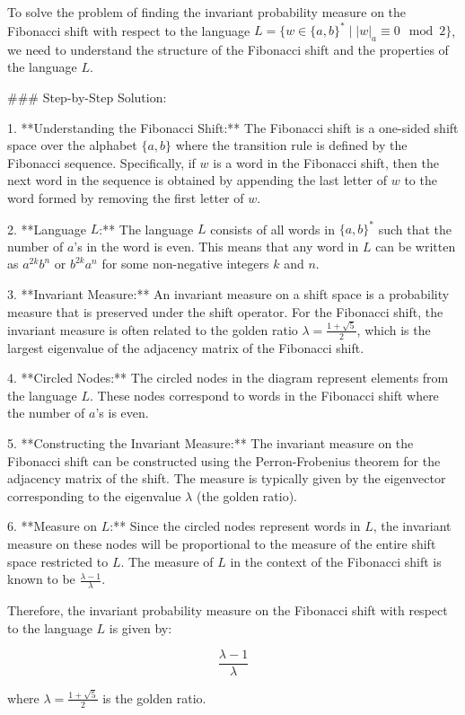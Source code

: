 To solve the problem of finding the invariant probability measure on the Fibonacci shift with respect to the language \( L = \{w \in \{a, b\}^* \mid |w|_a \equiv 0 \mod 2\} \), we need to understand the structure of the Fibonacci shift and the properties of the language \( L \).

### Step-by-Step Solution:

1. **Understanding the Fibonacci Shift:**
   The Fibonacci shift is a one-sided shift space over the alphabet \(\{a, b\}\) where the transition rule is defined by the Fibonacci sequence. Specifically, if \( w \) is a word in the Fibonacci shift, then the next word in the sequence is obtained by appending the last letter of \( w \) to the word formed by removing the first letter of \( w \).

2. **Language \( L \):**
   The language \( L \) consists of all words in \(\{a, b\}^*\) such that the number of \( a \)'s in the word is even. This means that any word in \( L \) can be written as \( a^{2k}b^n \) or \( b^{2k}a^n \) for some non-negative integers \( k \) and \( n \).

3. **Invariant Measure:**
   An invariant measure on a shift space is a probability measure that is preserved under the shift operator. For the Fibonacci shift, the invariant measure is often related to the golden ratio \(\lambda = \frac{1 + \sqrt{5}}{2}\), which is the largest eigenvalue of the adjacency matrix of the Fibonacci shift.

4. **Circled Nodes:**
   The circled nodes in the diagram represent elements from the language \( L \). These nodes correspond to words in the Fibonacci shift where the number of \( a \)'s is even.

5. **Constructing the Invariant Measure:**
   The invariant measure on the Fibonacci shift can be constructed using the Perron-Frobenius theorem for the adjacency matrix of the shift. The measure is typically given by the eigenvector corresponding to the eigenvalue \(\lambda\) (the golden ratio).

6. **Measure on \( L \):**
   Since the circled nodes represent words in \( L \), the invariant measure on these nodes will be proportional to the measure of the entire shift space restricted to \( L \). The measure of \( L \) in the context of the Fibonacci shift is known to be \(\frac{\lambda - 1}{\lambda}\).

Therefore, the invariant probability measure on the Fibonacci shift with respect to the language \( L \) is given by:

\[
\boxed{\frac{\lambda - 1}{\lambda}}
\]

where \(\lambda = \frac{1 + \sqrt{5}}{2}\) is the golden ratio.